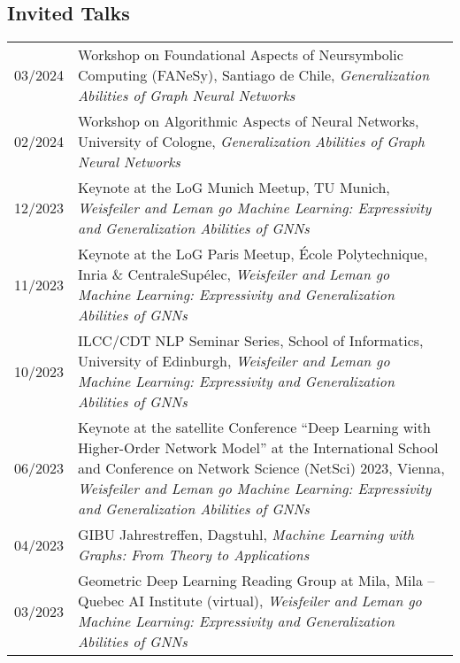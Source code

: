 \documentclass[11pt, a4paper, DIV=14, headings=small]{scrartcl}
\begin{document}
	\subsection*{Invited Talks}
	\begin{longtabu}{p{2.1cm}p{12.0cm}}
	     03/2024 & Workshop on Foundational Aspects of Neursymbolic Computing (FANeSy), Santiago de Chile, \emph{Generalization Abilities of Graph Neural Networks}\\  
	     02/2024 & Workshop on Algorithmic Aspects of Neural Networks, University of Cologne, \emph{Generalization Abilities of Graph Neural Networks}\\    
        12/2023 & Keynote at the LoG Munich Meetup, TU Munich, \emph{Weisfeiler and Leman go Machine Learning: Expressivity and Generalization Abilities of GNNs}\\             
		11/2023 & Keynote at the LoG Paris Meetup, École Polytechnique, Inria \& CentraleSupélec, \emph{Weisfeiler and Leman go Machine Learning: Expressivity and Generalization Abilities of GNNs}\\    
		10/2023 & ILCC/CDT NLP Seminar Series, School of Informatics, University of Edinburgh, \emph{Weisfeiler and Leman go Machine Learning: Expressivity and Generalization Abilities of GNNs}\\    
		06/2023 & Keynote at the satellite Conference ``Deep Learning with Higher-Order Network Model'' at the International School
		and Conference on Network Science (NetSci) 2023, Vienna, \emph{Weisfeiler and Leman go Machine Learning: Expressivity and Generalization Abilities of GNNs}\\                                                                                                                     
		04/2023 & GIBU Jahrestreffen, Dagstuhl, \emph{Machine Learning with Graphs: From Theory to Applications}                                                                                                                                                                                \\
		03/2023 & Geometric Deep Learning Reading Group at Mila, Mila -- Quebec AI Institute (virtual), \emph{Weisfeiler and Leman go Machine Learning: Expressivity and Generalization Abilities of GNNs}\\

\end{longtabu}
\end{document}

